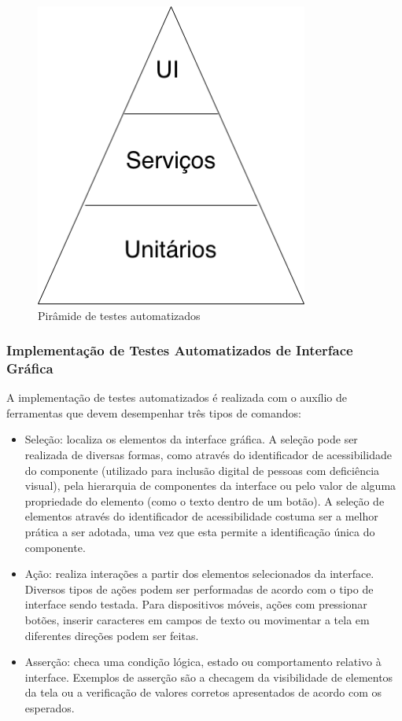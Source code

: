\begin{figure}[H]
    \centering
    \includegraphics[width=0.8\textwidth]{pfc/figuras/piramid.png}
    \caption{Pirâmide de testes automatizados}
    \label{fig:piramid}
\end{figure}

\subsubsection{Implementação de Testes Automatizados de Interface Gráfica}
A implementação de testes automatizados é realizada com o auxílio de ferramentas que devem desempenhar três tipos de comandos:

\begin{itemize}
    \item Seleção: localiza os elementos da interface gráfica. A seleção pode ser realizada de diversas formas, como através do identificador de acessibilidade do componente (utilizado para inclusão digital de pessoas com deficiência visual), pela hierarquia de componentes da interface ou pelo valor de alguma propriedade do elemento (como o texto dentro de um botão). A seleção de elementos através do identificador de acessibilidade costuma ser a melhor prática a ser adotada, uma vez que esta permite a identificação única do componente.
    \item Ação: realiza interações a partir dos elementos selecionados da interface. Diversos tipos de ações podem ser performadas de acordo com o tipo de interface sendo testada. Para dispositivos móveis, ações com pressionar botões, inserir caracteres em campos de texto ou movimentar a tela em diferentes direções podem ser feitas.
    \item Asserção: checa uma condição lógica, estado ou comportamento relativo à interface. Exemplos de asserção são a checagem da visibilidade de elementos da tela ou a verificação de valores corretos apresentados de acordo com os esperados.
\end{itemize}
